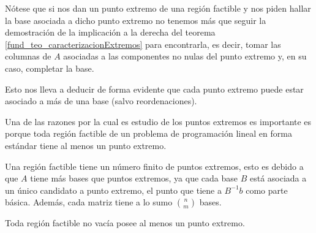 \begin{obs}
	Nótese que si nos dan un punto extremo de una región factible y nos piden hallar la base asociada a dicho punto extremo no tenemos más que seguir la demostración de la implicación a la derecha del teorema \ref{fund_teo_caracterizacionExtremos} para encontrarla, es decir, tomar las columnas de $A$ asociadas a las componentes no nulas del punto extremo y, en su caso, completar la base.
	
	Esto nos lleva a deducir de forma evidente que cada punto extremo puede estar asociado a más de una base (salvo reordenaciones).
\end{obs}
Una de las razones por la cual es estudio de los puntos extremos es importante es porque toda región factible de un problema de programación lineal en forma estándar tiene al menos un punto extremo.
\begin{obs}[Finitud]
	Una región factible tiene un número finito de puntos extremos, esto es debido a que $A$ tiene más bases que puntos extremos, ya que cada base $B$ está asociada a un único candidato a punto extremo, el punto que tiene a $B^{-1}b$ como parte básica. Además, cada matriz tiene a lo sumo $\binom{n}{m}$ bases.
\end{obs}
\begin{theo}[Existencia]
	\label{fund_teo_existenciaExtremos}
	Toda región factible no vacía posee al menos un punto extremo.
\end{theo}
